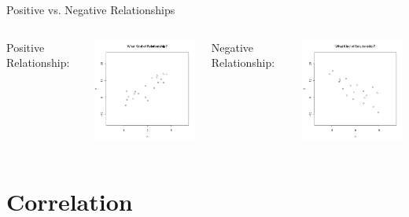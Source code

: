 \begin{frame}{Positive vs. Negative Relationships}

  \begin{columns}
    Positive Relationship: \\
    \centerline{\includegraphics[width=5cm]{img/week2Day3ClickerQuizPos}}
    Negative Relationship: \\
    \centerline{\includegraphics[width=5cm]{img/week2Day3ClickerQuizNeg}}
  \end{columns}
  
\end{frame}



\section{Correlation}

